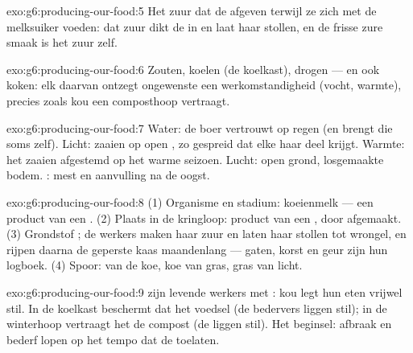 \begin{solution}{exo:g6:producing-our-food:5}
Het zuur dat de  afgeven terwijl ze zich met de melksuiker
voeden: dat zuur dikt de  in en laat haar stollen, en de frisse zure
smaak is het zuur zelf.
\end{solution}

\begin{solution}{exo:g6:producing-our-food:6}
Zouten, koelen (de koelkast), drogen --- en ook koken: elk daarvan
ontzegt ongewenste  een werkomstandigheid (vocht, warmte),
precies zoals kou een composthoop vertraagt.
\end{solution}

\begin{solution}{exo:g6:producing-our-food:7}
Water: de boer vertrouwt op regen (en brengt die soms zelf). Licht:
zaaien op open , zo gespreid dat elke  haar deel krijgt.
Warmte: het zaaien afgestemd op het warme seizoen. Lucht: open grond,
losgemaakte bodem. : mest en aanvulling na de oogst.
\end{solution}

\begin{solution}{exo:g6:producing-our-food:8}
(1) Organisme en stadium: koeienmelk --- een product van een .
(2) Plaats in de kringloop: product van een , door 
afgemaakt. (3) Grondstof ; de werkers maken haar zuur en laten haar
stollen tot wrongel, en rijpen daarna de geperste kaas maandenlang ---
gaten, korst en geur zijn hun logboek. (4) Spoor:  van de koe, koe
van gras, gras van licht.
\end{solution}

\begin{solution}{exo:g6:producing-our-food:9}
 zijn levende werkers met : kou legt hun eten
vrijwel stil. In de koelkast beschermt dat het voedsel (de bedervers
liggen stil); in de winterhoop vertraagt het de compost (de 
liggen stil). Het beginsel: afbraak en bederf lopen op het tempo dat de
 toelaten.
\end{solution}

